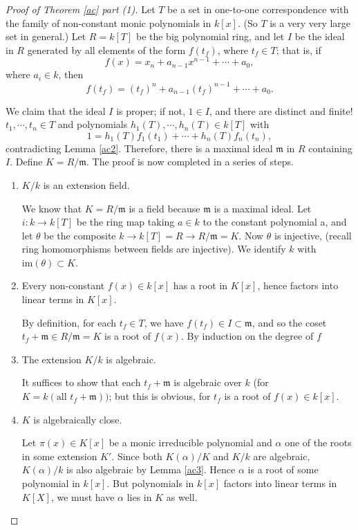 \documentclass[12pt]{report}
\theoremstyle{definition}
\newcommand{\im}{\text{im}}
\newcommand{\mm}{\mathfrak{m}}
\begin{document}
\begin{proof}[Proof of Theorem \ref{ac} part (1)]
	Let $T$ be a set in one-to-one correspondence with the family of non-constant monic polynomials in $k[x]$. (So $T$ is a very very large set in general.) Let $R = k[T]$ be the big polynomial ring, and let $I$ be the ideal in $R$ generated by all elements of the form $f(t_f)$, where $t_f\in T$; that is, if $$f(x) = x_n + a_{n-1}x^{n-1} + \cdots + a_0,$$ where $a_i \in k$, then $$f(t_f) = (t_f)^n + a_{n-1}(t_f)^{n-1} + \cdots + a_0.$$

	We claim that the ideal $I$ is proper; if not, $1 \in I$, and there are distinct and finite! $t_1, \cdots , t_n \in T$ and polynomials $h_1(T), \cdots , h_n(T) \in k[T]$ with $$ 1 = h_1(T)f_1(t_1) + \cdots + h_n(T)f_n(t_n),$$ contradicting Lemma \ref{ac2}. Therefore, there is a maximal ideal $\mm$ in $R$ containing $I$. Define $K = R/\mm$. The proof is now completed in a series of steps.
	\begin{enumerate}
		\item $K/k$ is an extension field.

		      We know that $K = R/\mm$ is a field because $\mm$ is a maximal ideal. Let $i : k \to  k[T]$ be the ring map taking $a \in k$ to the constant polynomial a, and let $\theta$ be the composite $k\to
			      k[T] = R\to R/\mm  = K$. Now $\theta$ is injective, (recall ring homomorphisms between fields are injective). We identify $k$ with $ \im (\theta)  \subset K$.

		\item  Every non-constant $f(x) \in k[x]$ has a root in $K[x]$, hence factors into linear terms in $K[x]$.

		      By definition, for each $t_f \in T$, we have $f(t_f ) \in I \subset \mm$, and so the coset $t_f +\mm \in R/\mm  = K$ is a root of $f(x)$. By induction on the degree of $f$

		\item The extension $K/k$ is algebraic.

		      It suffices to show that each $t_f+\mm$ is algebraic over $k$ (for $K = k(\mbox{all } t_f + \mm))$; but this is obvious, for $t_f$ is a root of $f(x) \in k[x]$.

		\item $K$ is algebraically close.

		      Let $\pi(x)\in K[x]$ be a monic irreducible polynomial and $\alpha$ one of the roots in some extension $K'$. Since both $K(\alpha)/K$ and $K/k$ are algebraic, $K(\alpha)/k$ is also algebraic by Lemma \ref{ac3}. Hence $\alpha$ is a root of some polynomial in $k[x]$. But polynomials in $k[x]$ factors into linear terms in $K[X]$, we must have $\alpha$ lies in $K$ as well.
	\end{enumerate}
\end{proof}
\end{document}
